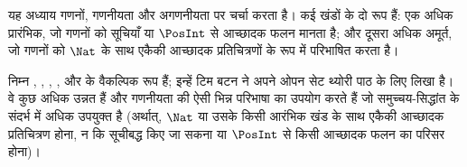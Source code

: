 \documentclass[../../../include/open-logic-chapter]{subfiles}
\begin{document}

\begin{editorial}
यह अध्याय गणनों, गणनीयता और अगणनीयता पर चर्चा करता है। कई खंडों के दो रूप
हैं: एक अधिक प्रारंभिक, जो गणनों को सूचियाँ या $\PosInt$ से आच्छादक फलन मानता
है; और दूसरा अधिक अमूर्त, जो गणनों को $\Nat$ के साथ एकैकी आच्छादक
प्रतिचित्रणों के रूप में परिभाषित करता है।
\end{editorial}











\begin{editorial}
निम्न ,
, ,
,  और
 के वैकल्पिक रूप हैं; इन्हें टिम बटन ने अपने ओपन
सेट थ्योरी पाठ के लिए लिखा है। वे कुछ अधिक उन्नत हैं और गणनीयता की ऐसी भिन्न
परिभाषा का उपयोग करते हैं जो समुच्चय-सिद्धांत के संदर्भ में अधिक उपयुक्त है
(अर्थात्, $\Nat$ या उसके किसी आरंभिक खंड के साथ एकैकी आच्छादक प्रतिचित्रण
होना, न कि सूचीबद्ध किए जा सकना या $\PosInt$ से किसी आच्छादक फलन का परिसर
होना)।
\end{editorial}


\OLEndChapterHook
\end{document}
